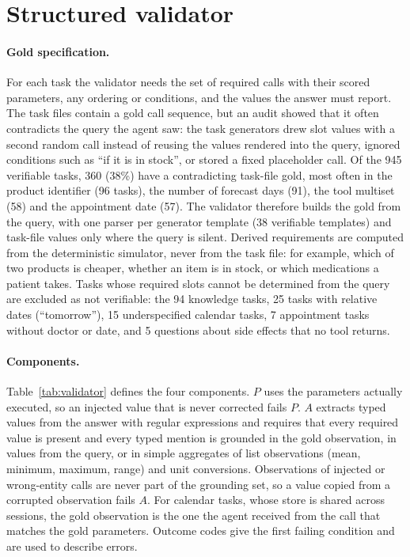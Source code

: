 \documentclass[pdflatex,sn-mathphys-num,Numbered]{sn-jnl}
\begin{document}
\section{Structured validator}\label{sec:validator}

\paragraph{Gold specification.} For each task the validator needs the set of required calls with their scored parameters, any ordering or conditions, and the values the answer must report. The task files contain a gold call sequence, but an audit showed that it often contradicts the query the agent saw: the task generators drew slot values with a second random call instead of reusing the values rendered into the query, ignored conditions such as ``if it is in stock'', or stored a fixed placeholder call. Of the 945 verifiable tasks, 360 (38\%) have a contradicting task-file gold, most often in the product identifier (96 tasks), the number of forecast days (91), the tool multiset (58) and the appointment date (57). The validator therefore builds the gold from the query, with one parser per generator template (38 verifiable templates) and task-file values only where the query is silent. Derived requirements are computed from the deterministic simulator, never from the task file: for example, which of two products is cheaper, whether an item is in stock, or which medications a patient takes. Tasks whose required slots cannot be determined from the query are excluded as not verifiable: the 94 knowledge tasks, 25 tasks with relative dates (``tomorrow''), 15 underspecified calendar tasks, 7 appointment tasks without doctor or date, and 5 questions about side effects that no tool returns.

\paragraph{Components.} Table~\ref{tab:validator} defines the four components. $P$ uses the parameters actually executed, so an injected value that is never corrected fails $P$. $A$ extracts typed values from the answer with regular expressions and requires that every required value is present and every typed mention is grounded in the gold observation, in values from the query, or in simple aggregates of list observations (mean, minimum, maximum, range) and unit conversions. Observations of injected or wrong-entity calls are never part of the grounding set, so a value copied from a corrupted observation fails $A$. For calendar tasks, whose store is shared across sessions, the gold observation is the one the agent received from the call that matches the gold parameters. Outcome codes give the first failing condition and are used to describe errors.
\end{document}

